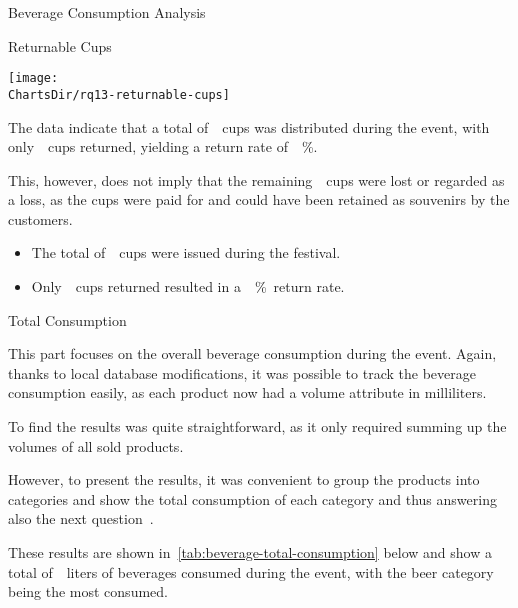 \begin{section}{Beverage Consumption Analysis}
\begin{subsection}{Returnable Cups}
		\begin{chart}[h]
			\centering
			\texttt{[image: \\ChartsDir/rq13-returnable-cups]}
			\caption{ Returnable Cups}
			\label{chart:returnable-cups}
			\source
		\end{chart}

		The data indicate that a total of~~cups was distributed during the event, with only~~cups returned, yielding a return rate of~~\%.

		This, however, does not imply that the remaining~~cups were lost or regarded as a loss, as the cups were paid for and could have been retained as souvenirs by the customers.

		\begin{keytakeaways}
			\begin{itemize}
				\item The total of~~cups were issued during the festival.
				\item Only~~cups returned resulted in a~~\%~return rate.
			\end{itemize}
		\end{keytakeaways}
	\end{subsection}

	\begin{subsection}{Total Consumption}
		\label{subsec:analysis-beverage-total-consumption}

		This part focuses on the overall beverage consumption during the event.
		Again, thanks to local database modifications, it was possible to track the beverage consumption easily, as each product now had a volume attribute in milliliters.


		To find the results was quite straightforward, as it only required summing up the volumes of all sold products.

		However, to present the results, it was convenient to group the products into categories and show the total consumption of each category and thus answering also the next question~.


		These results are shown in~\autoref{tab:beverage-total-consumption} below and show a total of~\bfmtnum{}~liters of beverages consumed during the event, with the beer category being the most consumed.


\end{subsection}
\end{section}
